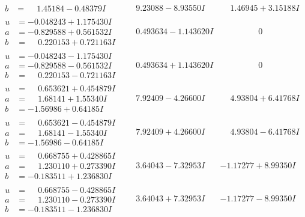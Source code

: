 \documentclass[1p]{elsarticle_modified}
\theoremstyle{definition}
\begin{document}
$$\begin{array}{c|c|c}
\begin{aligned}
b &= \phantom{-}1.45184 - 0.48379 I\end{aligned}
 & \phantom{-}9.23088 - 8.93550 I & \phantom{-}1.46945 + 3.15188 I \\ \hline\begin{aligned}
u &= -0.048243 + 1.175430 I \\
a &= -0.829588 + 0.561532 I \\
b &= \phantom{-}0.220153 + 0.721163 I\end{aligned}
 & \phantom{-}0.493634 - 1.143620 I & \phantom{-0.000000 } 0 \\ \hline\begin{aligned}
u &= -0.048243 - 1.175430 I \\
a &= -0.829588 - 0.561532 I \\
b &= \phantom{-}0.220153 - 0.721163 I\end{aligned}
 & \phantom{-}0.493634 + 1.143620 I & \phantom{-0.000000 } 0 \\ \hline\begin{aligned}
u &= \phantom{-}0.653621 + 0.454879 I \\
a &= \phantom{-}1.68141 + 1.55340 I \\
b &= -1.56986 + 0.64185 I\end{aligned}
 & \phantom{-}7.92409 - 4.26600 I & \phantom{-}4.93804 + 6.41768 I \\ \hline\begin{aligned}
u &= \phantom{-}0.653621 - 0.454879 I \\
a &= \phantom{-}1.68141 - 1.55340 I \\
b &= -1.56986 - 0.64185 I\end{aligned}
 & \phantom{-}7.92409 + 4.26600 I & \phantom{-}4.93804 - 6.41768 I \\ \hline\begin{aligned}
u &= \phantom{-}0.668755 + 0.428865 I \\
a &= \phantom{-}1.230110 + 0.273390 I \\
b &= -0.183511 + 1.236830 I\end{aligned}
 & \phantom{-}3.64043 - 7.32953 I & -1.17277 + 8.99350 I \\ \hline\begin{aligned}
u &= \phantom{-}0.668755 - 0.428865 I \\
a &= \phantom{-}1.230110 - 0.273390 I \\
b &= -0.183511 - 1.236830 I\end{aligned}
 & \phantom{-}3.64043 + 7.32953 I & -1.17277 - 8.99350 I \\ \hline\begin{aligned}

\end{aligned}
\end{array}$$
\end{document}

